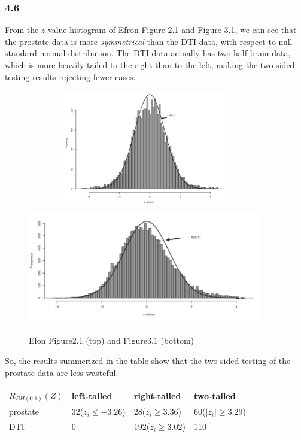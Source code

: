 \documentclass{article}
\begin{document}
\subsubsection*{4.6}
From the $z$-value histogram of Efron Figure 2.1 and Figure 3.1, we
can see that the prostate data is more \textit{symmetrical} than the
DTI data, with respect to null standard normal distribution. The DTI
data actually has two half-brain data, which is more heavily tailed to
the right than to the left, making the two-sided testing results
rejecting fewer cases.
\begin{figure}
\begin{center}
\includegraphics[height=2in,width=4in]{Fig21}
\includegraphics[height=2in,width=4in]{Fig31}
\caption{Efon Figure2.1 (top) and Figure3.1 (bottom)}
\end{center}
\end{figure}
So, the results summerized in the table show that the two-sided testing of the
prostate data are less wasteful. 
\begin{center}
\begin{tabular}{l|lll} \hline
$R_{BH(0.1)}(Z)$ & left-tailed & right-tailed & two-tailed  \\ \hline
prostate & 32($z_i\leq -3.26$) & 28($z_i\geq 3.36$) & 60($|z_i|\geq 3.29$) \\
DTI        & 0                              & 192($z_i\geq 3.02$) & 110
\end{tabular}
\end{center}
\end{document}
